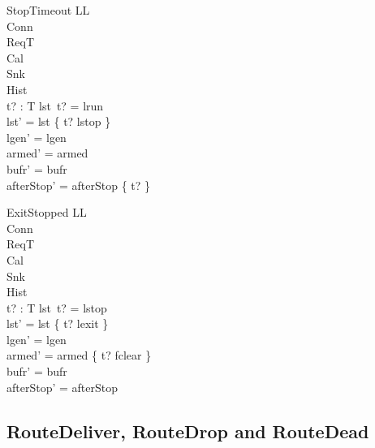 \documentclass[a4paper,10pt,fleqn]{article}
\begin{document}
\begin{schema}{StopTimeout}
  \Delta LL \\
  \Xi Conn \\
  \Xi ReqT \\
  \Xi Cal \\
  \Xi Snk \\
  \Xi Hist \\
  t? : T
\where
  lst~t? = lrun \\
  lst' = lst \oplus \{ t? \mapsto lstop \} \\
  lgen' = lgen \\
  armed' = armed \\
  bufr' = bufr \\
  afterStop' = afterStop \oplus \{ t?  \}
\end{schema}

\begin{schema}{ExitStopped}
  \Delta LL \\
  \Xi Conn \\
  \Xi ReqT \\
  \Xi Cal \\
  \Xi Snk \\
  \Xi Hist \\
  t? : T
\where
  lst~t? = lstop \\
  lst' = lst \oplus \{ t? \mapsto lexit \} \\
  lgen' = lgen \\
  armed' = armed \oplus \{ t? \mapsto fclear \} \\
  bufr' = bufr \\
  afterStop' = afterStop
\end{schema}

\subsection{RouteDeliver, RouteDrop and RouteDead}
\end{document}
